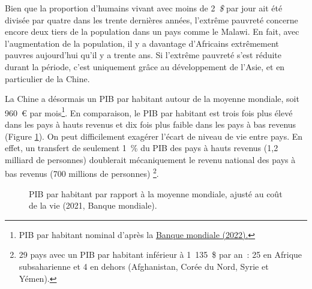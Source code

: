 \documentclass[a5paper,french,openany]{memoir}
\begin{document}
Bien que la proportion d'humains vivant avec moins de 2~\textit{\$} par jour ait été divisée par quatre dans les trente dernières années, l'extrême pauvreté concerne encore deux tiers de la population dans un pays comme le Malawi. En fait, avec l'augmentation de la population, il y a davantage d'Africains extrêmement pauvres aujourd'hui qu'il y a trente ans. Si l'extrême pauvreté s'est réduite durant la période, c'est uniquement grâce au développement de l'Asie, et en particulier de la Chine. %

La Chine a désormais un PIB par habitant autour de la moyenne mondiale, soit 960~\euro{} par mois\footnote{PIB par habitant nominal d'après la \href{https://data.worldbank.org/indicator/NY.GDP.PCAP.CD?end=2022&locations=CN-1W&start=2015}{Banque mondiale (2022).}}. %
En comparaison, le PIB par habitant est trois fois plus élevé dans les pays à hauts revenus et dix fois plus faible dans les pays à bas revenus (Figure \ref{fig:GDPpc}). On peut difficilement exagérer l'écart de niveau de vie entre pays. En effet, un transfert de seulement 1~\% du PIB des pays à hauts revenus (1,2 milliard de personnes) doublerait mécaniquement le revenu national 
des pays à bas revenus (700 millions de personnes)%
\footnote{
29 pays avec un PIB par habitant %
inférieur à 1~135~\$ par an~: 25 en Afrique subsaharienne et 4 en dehors (Afghanistan, Corée du Nord, Syrie et Yémen).
}. 

\begin{figure}[h!]
  \caption[Inégalités de PIB par habitant]{PIB par habitant par rapport à la moyenne mondiale, ajusté au coût de la vie (2021, Banque mondiale). %
  }\label{fig:GDPpc}
\end{figure}
\end{document}
